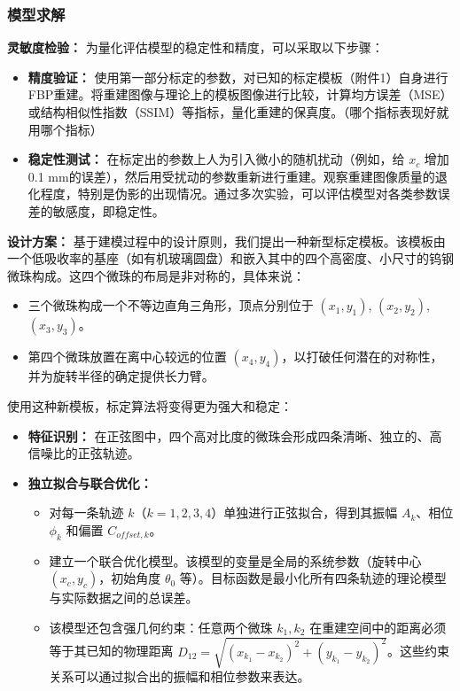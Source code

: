 \subsubsection{模型求解}
\textbf{灵敏度检验：}
为量化评估模型的稳定性和精度，可以采取以下步骤：
\begin{itemize}
    \item \textbf{精度验证：} 使用第一部分标定的参数，对已知的标定模板（附件1）自身进行FBP重建。将重建图像与理论上的模板图像进行比较，计算均方误差（MSE）或结构相似性指数（SSIM）等指标，量化重建的保真度。（哪个指标表现好就用哪个指标）  
    \item \textbf{稳定性测试：} 在标定出的参数上人为引入微小的随机扰动（例如，给 $x_c$ 增加0.1 mm的误差），然后用受扰动的参数重新进行重建。观察重建图像质量的退化程度，特别是伪影的出现情况。通过多次实验，可以评估模型对各类参数误差的敏感度，即稳定性。
\end{itemize}


\textbf{设计方案：}  
基于建模过程中的设计原则，我们提出一种新型标定模板。该模板由一个低吸收率的基座（如有机玻璃圆盘）和嵌入其中的四个高密度、小尺寸的钨钢微珠构成。这四个微珠的布局是非对称的，具体来说：
\begin{itemize}
    \item 三个微珠构成一个不等边直角三角形，顶点分别位于 $(x_1,y_1)$, $(x_2,y_2)$, $(x_3,y_3)$。  
    \item 第四个微珠放置在离中心较远的位置 $(x_4,y_4)$，以打破任何潜在的对称性，并为旋转半径的确定提供长力臂。
\end{itemize}
使用这种新模板，标定算法将变得更为强大和稳定：
\begin{itemize}
    \item \textbf{特征识别：} 在正弦图中，四个高对比度的微珠会形成四条清晰、独立的、高信噪比的正弦轨迹。  
    \item \textbf{独立拟合与联合优化：}  
    \begin{itemize}
        \item 对每一条轨迹 $k$（$k=1,2,3,4$）单独进行正弦拟合，得到其振幅 $A_k$、相位 $\phi_k$ 和偏置 $C_{offset,k}$。  
        \item 建立一个联合优化模型。该模型的变量是全局的系统参数（旋转中心 $(x_c,y_c)$，初始角度 $\theta_0$ 等）。目标函数是最小化所有四条轨迹的理论模型与实际数据之间的总误差。  
        \item 该模型还包含强几何约束：任意两个微珠 $k_1,k_2$ 在重建空间中的距离必须等于其已知的物理距离 $D_{12}=\sqrt{(x_{k_1}-x_{k_2})^2+(y_{k_1}-y_{k_2})^2}$。这些约束关系可以通过拟合出的振幅和相位参数来表达。  
    \end{itemize}
\end{itemize}


